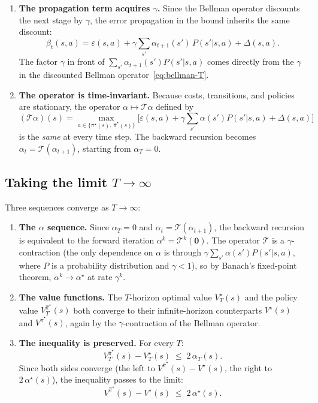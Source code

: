 \documentclass[11pt]{article}
\newcommand{\pistar}{\pi^\star}
\newcommand{\pihatstar}{\hat\pi^\star}
\newcommand{\Vstar}{V^\star}
\newcommand{\Vpihat}{V^{\pihatstar}}
\begin{document}
\begin{enumerate}
\item \textbf{The propagation term acquires $\gamma$.}
Since the Bellman operator discounts the next stage by $\gamma$, the error
propagation in the bound inherits the same discount:
\begin{equation}\label{eq:gamma-propagation}
  \beta_t(s,a)
  = \varepsilon(s,a) + \gamma \sum_{s'} \alpha_{t+1}(s')\, P(s'|s,a) + \Delta(s,a).
\end{equation}
The factor $\gamma$ in front of $\sum_{s'} \alpha_{t+1}(s') P(s'|s,a)$ comes
directly from the $\gamma$ in the discounted Bellman operator~\eqref{eq:bellman-T}.

\item \textbf{The operator is time-invariant.}
Because costs, transitions, and policies are stationary, the operator
$\alpha \mapsto \mathcal{T}\alpha$ defined by
\begin{equation}\label{eq:T-operator}
  (\mathcal{T}\alpha)(s)
  = \max_{a \in \{\pistar(s),\, \pihatstar(s)\}}
    \bigl[\varepsilon(s,a) + \gamma \textstyle\sum_{s'} \alpha(s') P(s'|s,a) + \Delta(s,a)\bigr]
\end{equation}
is the \emph{same} at every time step.  The backward recursion becomes
$\alpha_t = \mathcal{T}(\alpha_{t+1})$, starting from $\alpha_T = 0$.
\end{enumerate}

\subsection{Taking the limit $T \to \infty$}

Three sequences converge as $T \to \infty$:

\begin{enumerate}
\item \textbf{The $\alpha$ sequence.}
Since $\alpha_T = 0$ and $\alpha_t = \mathcal{T}(\alpha_{t+1})$, the backward
recursion is equivalent to the forward iteration $\alpha^k = \mathcal{T}^k(\mathbf{0})$.
The operator $\mathcal{T}$ is a $\gamma$-contraction (the only dependence on
$\alpha$ is through $\gamma \sum_{s'} \alpha(s') P(s'|s,a)$, where $P$ is a
probability distribution and $\gamma < 1$), so by Banach's fixed-point theorem,
$\alpha^k \to \alpha^\star$ at rate $\gamma^k$.

\item \textbf{The value functions.}
The $T$-horizon optimal value $V^\star_T(s)$ and the policy value
$V^{\pihatstar}_T(s)$ both converge to their infinite-horizon counterparts
$\Vstar(s)$ and $\Vpihat(s)$, again by the $\gamma$-contraction of the
Bellman operator.

\item \textbf{The inequality is preserved.}
For every $T$:
\[
  V^{\pihatstar}_T(s) - V^\star_T(s) \;\le\; 2\,\alpha_T(s).
\]
Since both sides converge (the left to $\Vpihat(s) - \Vstar(s)$, the right to
$2\,\alpha^\star(s)$), the inequality passes to the limit:
\[
  \Vpihat(s) - \Vstar(s) \;\le\; 2\,\alpha^\star(s).
\]
\end{enumerate}
\end{document}
